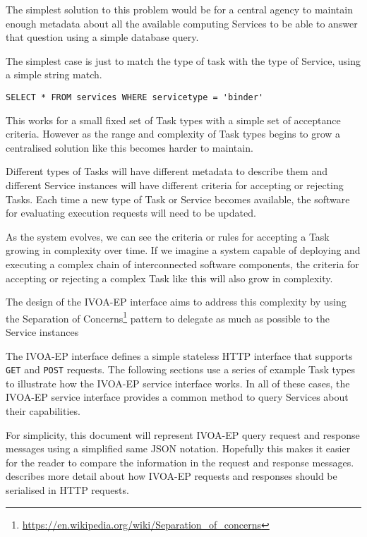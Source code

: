 \documentclass[11pt,a4paper]{ivoa}
\newcommand{\json} {JSON\xspace}
\newcommand{\ivoep} {IVOA-EP\xspace}
\newcommand{\codeword}[1] {\texttt{#1}}
\newcommand{\footurl}[1] {\footnote{\url{#1}}}
\begin{document}
The simplest solution to this problem would be for a central agency to maintain enough metadata about all the available computing Services to be able to answer that question using a simple database query.

The simplest case is just to match the type of task with the type of Service, using a simple string match.

\begin{verbatim}
SELECT * FROM services WHERE servicetype = 'binder'
\end{verbatim}

This works for a small fixed set of Task types with a simple set of acceptance criteria. However as the range and complexity of Task types begins to grow a centralised solution like this becomes harder to maintain.

Different types of Tasks will have different metadata to describe them and different Service instances will have different criteria for accepting or rejecting Tasks. Each time a new type of Task or Service becomes available, the software for evaluating execution requests will need to be updated.

As the system evolves, we can see the criteria or rules for accepting a Task growing in complexity over time. If we imagine a system capable of deploying and executing a complex chain of interconnected software components, the criteria for accepting or rejecting a complex Task like this will also grow in complexity.

The design of the \ivoep interface aims to address this complexity by using the Separation of Concerns\footurl{https://en.wikipedia.org/wiki/Separation_of_concerns} pattern to delegate as much as possible to the Service instances

The \ivoep interface defines a simple stateless HTTP interface that supports \codeword{GET} and \codeword{POST} requests.
The following sections use a series of example Task types to illustrate how the \ivoep service interface works.
In all of these cases, the \ivoep service interface provides a common method to query Services about their capabilities.

For simplicity, this document will represent \ivoep query request and response messages using a simplified same \json notation.
Hopefully this makes it easier for the reader to compare the information in the request and response messages.
 describes more detail about how \ivoep requests and responses should be serialised in HTTP requests.
\end{document}
